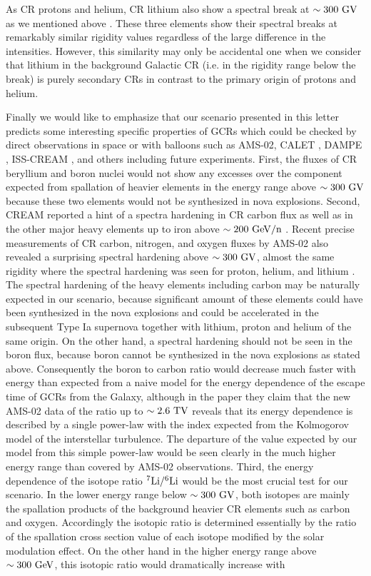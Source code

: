 \documentclass[twocolumn,showpacs,amsmath,amssymb]{revtex4-1}
\begin{document}
As CR protons and helium, CR lithium also show a spectral break at $\sim 300~{\rm GV}$ as we mentioned above \citep{yan+17}.  These three elements show their spectral breaks at remarkably similar rigidity values regardless of the large difference in the intensities.  However, this similarity may only be accidental one when we consider that lithium in the background Galactic CR (i.e. in the rigidity range below the break) is purely secondary CRs in contrast to the primary origin of protons and helium.

Finally we would like to emphasize that our scenario presented in this letter predicts some interesting specific properties of GCRs which could be checked by direct observations in space or with balloons such as AMS-02, CALET \cite{2015ICRC...34..581T}, DAMPE \cite{2017EPJWC.13602010D}, ISS-CREAM \cite{isscream}, and others including future experiments.  First, the fluxes of CR beryllium and boron nuclei would not show any excesses over the component expected from spallation of heavier elements in the energy range above $\sim 300~{\rm GV}$ because these two elements would not be synthesized in nova explosions.   Second, CREAM reported a hint of a spectra hardening in CR carbon flux as well as in the other major heavy elements up to iron above $\sim 200~{\rm GeV}/{\rm n}$ \cite{2012APh....39...76S}.  Recent precise measurements of CR carbon, nitrogen, and oxygen fluxes by AMS-02 also revealed a surprising spectral hardening above $\sim 300~{\rm GV}$, almost the same rigidity where the spectral hardening was seen for proton, helium, and lithium \cite{yan+17}.  The spectral hardening of the heavy elements including carbon may be naturally expected in our scenario, because significant amount of these elements could have been synthesized in the nova explosions and could be accelerated in the subsequent Type Ia supernova together with lithium, proton and helium of the same origin.  On the other hand, a spectral hardening should not be seen in the boron flux, because boron cannot be synthesized in the nova explosions as stated above.  Consequently the boron to carbon ratio would decrease much faster with energy than expected from a naive model for the energy dependence of the escape time of GCRs from the Galaxy, although in the paper \cite{2016PhRvL.117w1102A} they claim that the new AMS-02 data of the ratio up to $\sim 2.6~{\rm TV}$ reveals that its energy dependence is described by a single power-law with the index expected from the Kolmogorov model of the interstellar turbulence.  The departure of the value expected by our model from this simple power-law would be seen clearly in the much higher energy range than covered by AMS-02 observations.  Third, the energy dependence of the isotope ratio $^7{\rm Li}/^6{\rm Li}$ would be the most crucial test for our scenario.  In the lower energy range below $\sim 300~{\rm GV}$, both isotopes are mainly the spallation products of the background heavier CR elements such as carbon and oxygen.  Accordingly the isotopic ratio is determined essentially by the ratio of the spallation cross section value of each isotope modified by the solar modulation effect.  On the other hand in the higher energy range above $\sim 300~{\rm GeV}$, this isotopic ratio would dramatically increase with 
\end{document}
